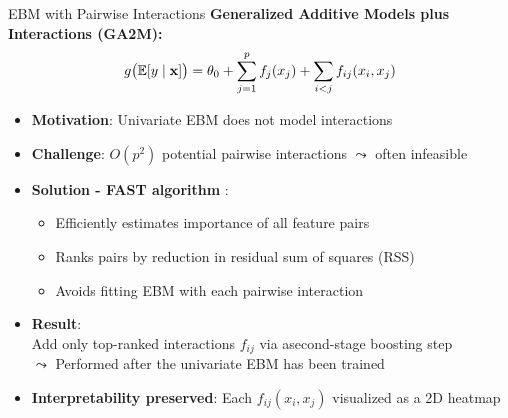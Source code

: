 \documentclass[10pt,compress,t,notes=noshow, xcolor=table]{beamer}
\begin{document}


\begin{frame}{EBM with Pairwise Interactions}
\textbf{Generalized Additive Models plus Interactions (GA2M):}
$$
g\big(\mathbb{E}[y \mid \mathbf{x}]\big) = \theta_0 + \sum_{j=1}^p f_j(x_j) + \sum_{i<j} f_{ij}(x_i, x_j)
$$

\begin{itemize}
    \item \textbf{Motivation}: Univariate EBM does not model interactions
    \item \textbf{Challenge}: $O(p^2)$ potential pairwise interactions
    $\leadsto$ often infeasible %
    \item \textbf{Solution - FAST algorithm} %
:
    \begin{itemize}
        \item Efficiently estimates importance of all feature pairs
        \item Ranks pairs by reduction in residual sum of squares (RSS)
        \item Avoids fitting EBM with each pairwise interaction
    \end{itemize}
    \item \textbf{Result}: \\Add only top-ranked interactions $f_{ij}$ via asecond-stage boosting step\\
    $\leadsto$ Performed after the univariate EBM has been trained
    \item \textbf{Interpretability preserved}: Each $f_{ij}(x_i, x_j)$ visualized as a 2D heatmap
\end{itemize}
\end{frame}
\end{document}
